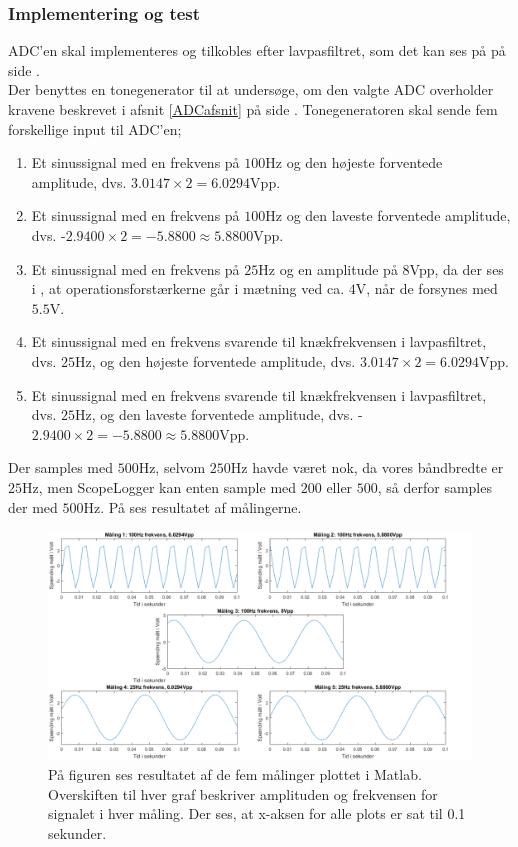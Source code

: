 \subsubsection{Implementering og test}
ADC'en skal implementeres og tilkobles efter lavpasfiltret, som det kan ses på  på side \pageref{kravblok}. \\
Der benyttes en tonegenerator til at undersøge, om den valgte ADC overholder kravene beskrevet i afsnit \ref{ADCafsnit} på side \pageref{ADCafsnit}. Tonegeneratoren skal sende fem forskellige input til ADC'en;
\begin{enumerate}
	\item Et sinussignal med en frekvens på $100$Hz og den højeste forventede amplitude, dvs. $3.0147 \times 2 = 6.0294\text{Vpp}$.
	\item Et sinussignal med en frekvens på $100$Hz og den laveste forventede amplitude, dvs. -$2.9400 \times 2 = -5.8800 \approx 5.8800\text{Vpp}$.
	\item Et sinussignal med en frekvens på $25$Hz og en amplitude på $8$Vpp, da der ses i , at operationsforstærkerne går i mætning ved ca. $4$V, når de forsynes med $5.5$V. 
	\item Et sinussignal med en frekvens svarende til knækfrekvensen i lavpasfiltret, dvs. $25$Hz, og den højeste forventede amplitude, dvs. $3.0147 \times 2 = 6.0294\text{Vpp}$.
	\item Et sinussignal med en frekvens svarende til knækfrekvensen i lavpasfiltret, dvs. $25$Hz, og den laveste forventede amplitude, dvs. -$2.9400 \times 2 = -5.8800 \approx 5.8800\text{Vpp}$.
\end{enumerate}
Der samples med $500$Hz, selvom $250$Hz havde været nok, da vores båndbredte er $25$Hz, men ScopeLogger kan enten sample med $200$ eller $500$, så derfor samples der med $500$Hz. På  ses resultatet af målingerne.

\begin{figure}[H]
	\centering
	\includegraphics[scale=0.45]{figures/cProblemloesning/ADC_Test2_matlab.PNG}
	\caption{På figuren ses resultatet af de fem målinger plottet i Matlab. Overskiften til hver graf beskriver amplituden og frekvensen for signalet i hver måling. Der ses, at x-aksen for alle plots er sat til 0.1 sekunder.}
	\label{fig:ADC_Test}
\end{figure}


